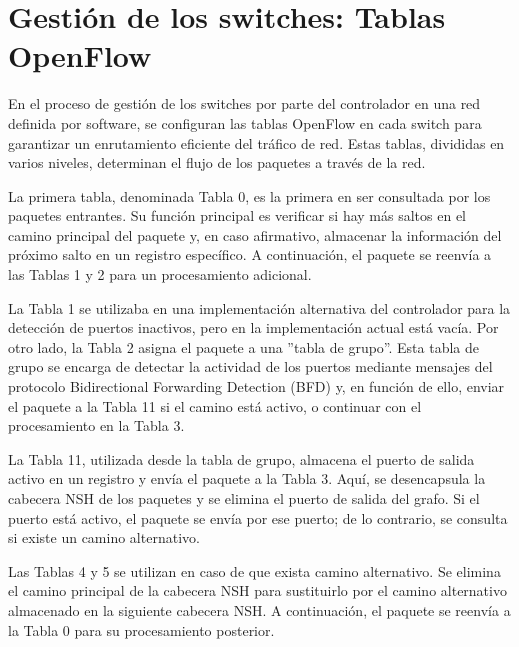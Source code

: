 \documentclass[a4paper, 12pt]{book}
\begin{document}
	\section{Gestión de los switches: Tablas OpenFlow}
	
	En el proceso de gestión de los switches por parte del controlador en una red definida por software, se configuran las tablas OpenFlow en cada switch para garantizar un enrutamiento eficiente del tráfico de red. Estas tablas, divididas en varios niveles, determinan el flujo de los paquetes a través de la red.
	
	La primera tabla, denominada Tabla 0, es la primera en ser consultada por los paquetes entrantes. Su función principal es verificar si hay más saltos en el camino principal del paquete y, en caso afirmativo, almacenar la información del próximo salto en un registro específico. A continuación, el paquete se reenvía a las Tablas 1 y 2 para un procesamiento adicional.
	
	La Tabla 1 se utilizaba en una implementación alternativa del controlador para la detección de puertos inactivos, pero en la implementación actual está vacía. Por otro lado, la Tabla 2 asigna el paquete a una ''tabla de grupo''. Esta tabla de grupo se encarga de detectar la actividad de los puertos mediante mensajes del protocolo Bidirectional Forwarding Detection (BFD) y, en función de ello, enviar el paquete a la Tabla 11 si el camino está activo, o continuar con el procesamiento en la Tabla 3.
	
	La Tabla 11, utilizada desde la tabla de grupo, almacena el puerto de salida activo en un registro y envía el paquete a la Tabla 3. Aquí, se desencapsula la cabecera NSH de los paquetes y se elimina el puerto de salida del grafo. Si el puerto está activo, el paquete se envía por ese puerto; de lo contrario, se consulta si existe un camino alternativo.
	
	Las Tablas 4 y 5 se utilizan en caso de que exista camino alternativo. Se elimina el camino principal de la cabecera NSH para sustituirlo por el camino alternativo almacenado en la siguiente cabecera NSH. A continuación, el paquete se reenvía a la Tabla 0 para su procesamiento posterior.
	
	 
	
\end{document}
